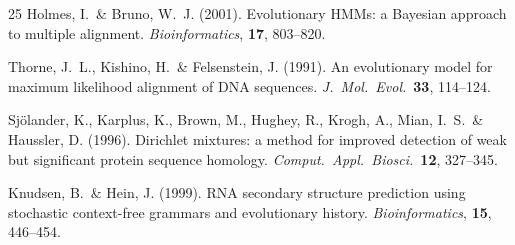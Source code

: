 \documentclass[12pt]{article}
\begin{document}
\begin{thebibliography}{25}
Holmes, I.\ \& Bruno, W.~J. (2001). Evolutionary HMMs: a Bayesian approach to multiple alignment.
\textit{Bioinformatics}, \textbf{17}, 803--820.

Thorne, J.~L., Kishino, H.\ \& Felsenstein, J. (1991). An evolutionary model for maximum likelihood
alignment of DNA sequences. \textit{J.\ Mol.\ Evol.}\ \textbf{33}, 114--124.

Sj\"olander, K., Karplus, K., Brown, M., Hughey, R., Krogh, A., Mian, I.~S.\ \& Haussler, D. (1996).
Dirichlet mixtures: a method for improved detection of weak but significant protein sequence
homology. \textit{Comput.\ Appl.\ Biosci.}\ \textbf{12}, 327--345.

Knudsen, B.\ \& Hein, J. (1999). RNA secondary structure prediction using stochastic context-free
grammars and evolutionary history. \textit{Bioinformatics}, \textbf{15}, 446--454.

\end{thebibliography}
\end{document}
